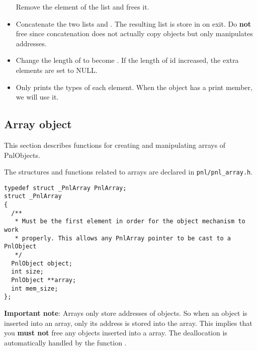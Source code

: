 \begin{itemize}
  \sshortdescribe Remove the  element of the list  and frees it.
\item {}
  \sshortdescribe Concatenate the two lists  and . The
  resulting list is store in  on exit. Do {\bf not} free 
  since concatenation does not actually copy objects but only manipulates
  addresses.
\item {}
  \sshortdescribe Change the length of  to become . If the length
  of  id increased, the extra elements are set to NULL.
\item {}
  \sshortdescribe Only prints the types of each element. When  the
  \PnlObject object has a print member, we will use it.
\end{itemize}

\subsection{Array object}

This section describes functions for creating and manipulating arrays of
PnlObjects.

The structures and functions related to arrays are declared in
\verb!pnl/pnl_array.h!.

\begin{verbatim}
typedef struct _PnlArray PnlArray;
struct _PnlArray
{
  /**
   * Must be the first element in order for the object mechanism to work
   * properly. This allows any PnlArray pointer to be cast to a PnlObject
   */
  PnlObject object; 
  int size;
  PnlObject **array;
  int mem_size;
};
\end{verbatim}

\textbf{Important note}: Arrays only store addresses of objects. So when an
object is inserted into an array, only its address is stored into the array. This
implies that you \textbf{must not} free any objects inserted into a array. The
deallocation is automatically handled by the function .

